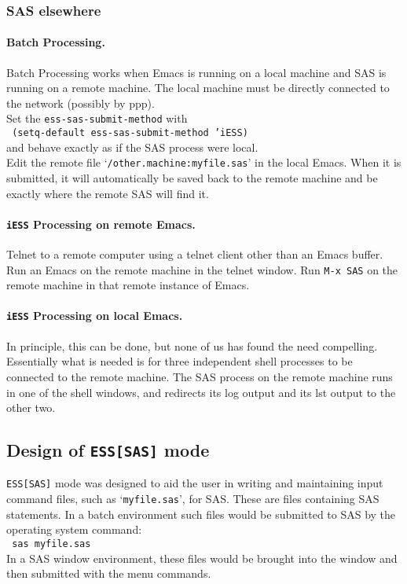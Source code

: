 \documentclass{article}
\newcommand{\stexttt}[1]{{\small\texttt{#1}}}
\newcommand{\ssf}[1]{{\small\sf{#1}}}
\newcommand{\elcode}[1]{\\{\stexttt{\hspace*{2em} #1}}\\}
\newcommand{\file}[1]{`\stexttt{#1}'}
\begin{document}
\subsubsection{SAS elsewhere}

\paragraph{Batch Processing.}
Batch Processing works when Emacs is running on a local machine and SAS
is running on a remote machine.  The local machine must be directly
connected to the network (possibly by ppp).\\
Set the \stexttt{ess-sas-submit-method} with
\elcode{(setq-default ess-sas-submit-method 'iESS)}
and behave exactly as if the SAS process were local.\\
Edit the remote file
\file{/other.machine:myfile.sas}
in the local Emacs.
When it is submitted, it will automatically be saved back to the remote
machine and be exactly where the remote SAS will find it.

\paragraph{\stexttt{iESS} Processing on remote Emacs.}
Telnet to a remote computer using a telnet client other than an Emacs buffer.
Run an Emacs on the remote machine in the telnet window.
Run \stexttt{M-x SAS} on the remote machine in that remote instance of Emacs.

\paragraph{\stexttt{iESS} Processing on local Emacs.}
In principle, this can be done, but none of us has found the need
compelling.  Essentially what is needed is for three independent shell
processes to be connected to the remote machine.  The SAS process on
the remote machine runs in one of the shell windows, and redirects its
log output and its lst output to the other two.

\subsection{Design of \texttt{ESS[SAS]} mode}
\label{sec:SAS:phil}

\stexttt{ESS[SAS]} mode was designed to aid the user in writing and maintaining
input command files, such as \file{myfile.sas}, for SAS.  These are files
containing SAS statements.  In a batch environment such files would be
submitted to SAS by the operating system command:
\elcode{sas myfile.sas}
In a SAS window environment, these files would be brought into the
\ssf{SAS: PROGRAM EDITOR} window and then submitted with the
\ssf{Local/Submit}
menu commands.
\end{document}
